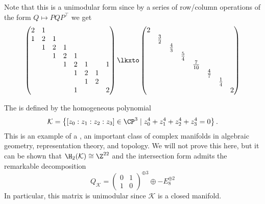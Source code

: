 \begin{definition}
Note that this is a unimodular form since by a series of row/column operations of the form $Q\mapsto PQP^\intercal$ we get
	\[
		\begin{pmatrix}
			2 & 1 &   &   &   &   &   &   \\
			1 & 2 & 1 &   &   &   &   &   \\
			  & 1 & 2 & 1 &   &   &   &   \\
			  &   & 1 & 2 & 1 &   &   &   \\
			  &   &   & 1 & 2 & 1 &   & 1 \\
			  &   &   &   & 1 & 2 & 1 &   \\
			  &   &   &   &   & 1 & 2 &   \\
			  &   &   &   & 1 &   &   & 2 \\
		\end{pmatrix}
		\lkxto
		\begin{pmatrix}
			2 &             &             &             &              &             &             &   \\
			  & \frac{3}{2} &             &             &              &             &             &   \\
			  &             & \frac{4}{3} &             &              &             &             &   \\
			  &             &             & \frac{5}{4} &              &             &             &   \\
			  &             &             &             & \frac{7}{10} &             &             &   \\
			  &             &             &             &              & \frac{4}{7} &             &   \\
			  &             &             &             &              &             & \frac{1}{4} &   \\
			  &             &             &             &              &             &             & 2 \\
		\end{pmatrix}
	\]

\begin{example}\label{example:k3}
	The  is defined by the homogeneous polynomial
	\[
		\mathcal{K} = \left\{ [z_0 : z_1 : z_2 : z_3]\in \CP^3 \mid z_0^4 + z_1^4+z_2^4 + z_3^4=0\right\}.
	\]
	This is an example of a , an important class of complex manifolds in algebraic geometry, representation theory, and topology.
	We will not prove this here, but it can be shown that $\H_2(\mathcal{K})\cong \Z^{22}$ and the intersection form admits the remarkable decomposition
	\[
		Q_{\mathcal{K}} =
		\begin{pmatrix}
			0 & 1 \\ 1 & 0
		\end{pmatrix}^{\oplus 3}\oplus
		-E_8^{\oplus 2}
	\]
	In particular, this matrix is unimodular since $\mathcal{K}$ is a closed manifold. 
\end{example}


\end{definition}
